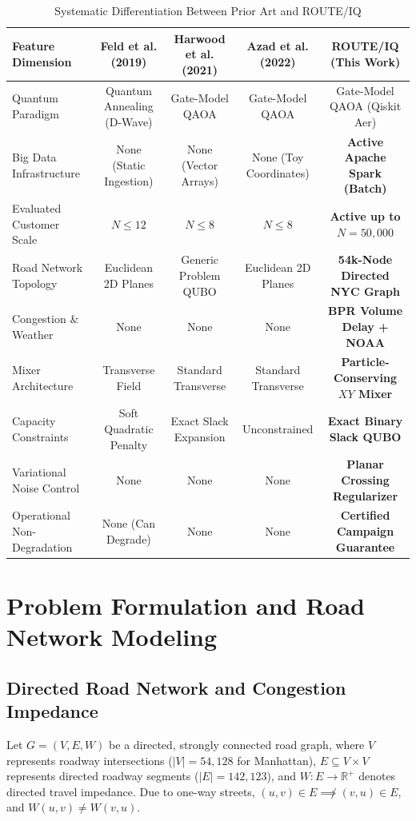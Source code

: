 \documentclass[journal,10pt]{IEEEtran}
\begin{document}
\begin{table}[t]
\caption{Systematic Differentiation Between Prior Art and ROUTE/IQ}
\label{tab:prior_art}
\centering
\begin{tabular}{lcccc}
\toprule
\textbf{Feature Dimension} & \textbf{Feld et al. (2019) \cite{feld2019hybrid}} & \textbf{Harwood et al. (2021) \cite{harwood2021formulating}} & \textbf{Azad et al. (2022) \cite{azad2022solving}} & \textbf{ROUTE/IQ (This Work)} \\
\midrule
Quantum Paradigm & Quantum Annealing (D-Wave) & Gate-Model QAOA & Gate-Model QAOA & Gate-Model QAOA (Qiskit Aer) \\
Big Data Infrastructure & None (Static Ingestion) & None (Vector Arrays) & None (Toy Coordinates) & \textbf{Active Apache Spark (Batch)} \\
Evaluated Customer Scale & $N \le 12$ & $N \le 8$ & $N \le 8$ & \textbf{Active up to $N = 50,000$} \\
Road Network Topology & Euclidean 2D Planes & Generic Problem QUBO & Euclidean 2D Planes & \textbf{54k-Node Directed NYC Graph} \\
Congestion \& Weather & None & None & None & \textbf{BPR Volume Delay + NOAA} \\
Mixer Architecture & Transverse Field & Standard Transverse & Standard Transverse & \textbf{Particle-Conserving $XY$ Mixer} \\
Capacity Constraints & Soft Quadratic Penalty & Exact Slack Expansion & Unconstrained & \textbf{Exact Binary Slack QUBO} \\
Variational Noise Control & None & None & None & \textbf{Planar Crossing Regularizer} \\
Operational Non-Degradation & None (Can Degrade) & None & None & \textbf{Certified Campaign Guarantee} \\
\bottomrule
\end{tabular}
\end{table}

\section{Problem Formulation and Road Network Modeling}
\subsection{Directed Road Network and Congestion Impedance}
Let $G = (V, E, W)$ be a directed, strongly connected road graph, where $V$ represents roadway intersections ($|V| = 54,128$ for Manhattan), $E \subseteq V \times V$ represents directed roadway segments ($|E| = 142,123$), and $W: E \to \mathbb{R}^+$ denotes directed travel impedance. Due to one-way streets, $(u, v) \in E \not\implies (v, u) \in E$, and $W(u, v) \ne W(v, u)$.
\end{document}
